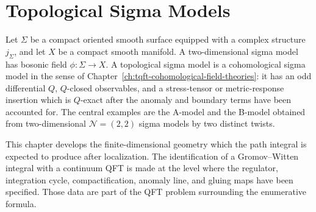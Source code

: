 \chapter{Topological Sigma Models}
\label{ch:tqft-topological-sigma-models}

\ConventionsEuclidean

Let \(\Sigma\) be a compact oriented smooth surface equipped with a complex
structure \(j_\Sigma\), and let \(X\) be a compact smooth manifold.  A
two-dimensional sigma model has bosonic field \(\phi:\Sigma\to X\).  A
topological sigma model is a cohomological sigma model in the sense of
Chapter~\ref{ch:tqft-cohomological-field-theories}: it has an odd differential
\(Q\), \(Q\)-closed observables, and a stress-tensor or metric-response
insertion which is \(Q\)-exact after the anomaly and boundary terms have been
accounted for.  The central examples are the A-model and the B-model obtained
from two-dimensional \(\mathcal N=(2,2)\) sigma models by two distinct twists.

This chapter develops the finite-dimensional geometry which the path integral
is expected to produce after localization.  The identification of a
Gromov--Witten integral with a continuum QFT is made at the level where the
regulator, integration cycle, compactification, anomaly line, and gluing maps
have been specified.  Those data are part of the QFT problem surrounding the
enumerative formula.

